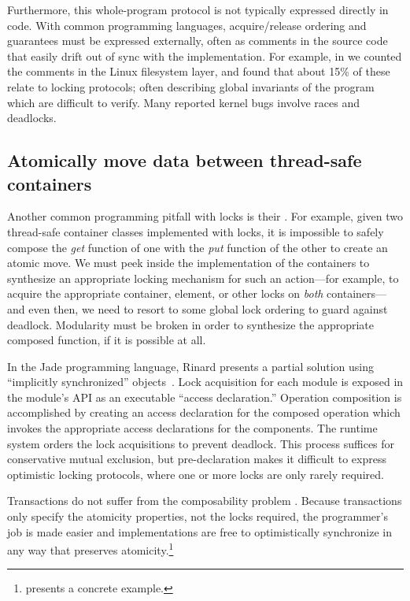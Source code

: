 Furthermore, this whole-program protocol is not typically expressed
directly in code.  With common programming languages, acquire/release
ordering and guarantees must be expressed externally, often as
comments in the source code that easily drift out of sync with the
implementation.  For example, in \cite{AnanianAsKuLeLi05} we counted
the comments in the Linux filesystem layer, and found that about 15\%
of these relate to locking protocols; often describing global
invariants of the program which are difficult to verify.  Many
reported kernel bugs involve races and deadlocks.


\subsection{Atomically move data between thread-safe containers}
Another common programming pitfall with locks is their
.
For example, given two thread-safe
container classes implemented with locks, it is impossible to
safely compose
the \textit{get} function of one with the \textit{put} function of
the other to create an atomic move.  We must peek inside the
implementation of the containers to synthesize an appropriate locking
mechanism for such an action---for example, to acquire the 
appropriate
container, element, or other
locks on \emph{both} containers---and even then,
we need to resort to some global lock ordering to guard against
deadlock.  Modularity must be broken in order to synthesize the
appropriate composed function, if it is possible at all.

In the Jade programming language, Rinard presents a partial
solution using ``implicitly synchronized''
objects~\cite[p14]{Rinard98}.  Lock acquisition for each module is
exposed in the module's API as an executable ``access declaration.''
Operation composition is accomplished by creating an access
declaration for the composed operation which invokes the appropriate
access declarations for the components.  The runtime system orders the
lock acquisitions to prevent deadlock.  This process suffices for
conservative mutual exclusion, but pre-declaration makes it difficult
to express optimistic locking protocols, where one or more locks are
only rarely required.

Transactions do not suffer from the composability problem
\cite{HarrisMaPeHe05}.  Because transactions only specify the atomicity
properties, not the locks required, the programmer's job is made easier and
implementations are free to optimistically synchronize in any way that
preserves atomicity.\footnote{ presents a concrete example.}

